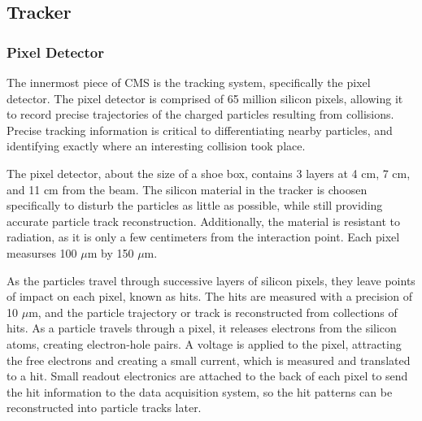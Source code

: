 \subsection{Tracker}
\subsubsection{Pixel Detector}
The innermost piece of CMS is the tracking system, specifically the pixel detector. The pixel detector is comprised of 65 million silicon pixels, allowing it to record
precise trajectories of the charged particles resulting from collisions. Precise tracking information is critical to differentiating nearby particles, and identifying
exactly where an interesting collision took place. 

The pixel detector, about the size of a shoe box, contains 3 layers at 4 cm, 7 cm, and 11 cm from the beam.
The silicon material in the tracker is choosen specifically to disturb the particles as little as possible, while still providing accurate particle track reconstruction.
Additionally, the material is resistant to radiation, as it is only a few centimeters from the interaction point. Each pixel measurses 100 $\mu$m by 150 $\mu$m. 

As the particles travel through successive layers of silicon pixels, they leave points of impact on each pixel, known as hits.
The hits are measured with a precision of 10 $\mu$m, and the particle trajectory or track is reconstructed from collections of hits. 
As a particle travels through a pixel, it releases electrons from the silicon atoms, creating electron-hole pairs.
A voltage is applied to the pixel, attracting the free electrons and creating a small current, which is measured and translated to a hit. Small readout electronics
are attached to the back of each pixel to send the hit information to the data acquisition system, so the hit patterns can be reconstructed into particle tracks later.   

